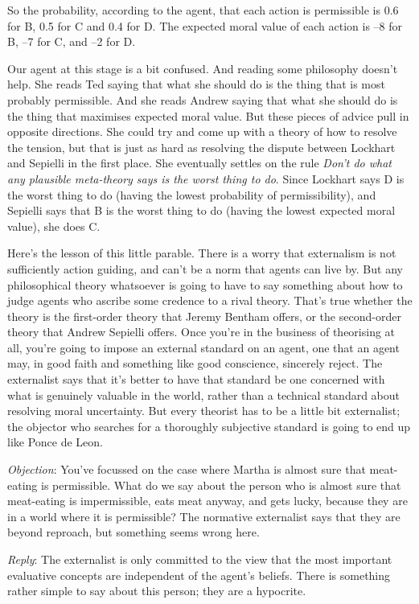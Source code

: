 So the probability, according to the agent, that each action is permissible is 0.6 for B, 0.5 for C and 0.4 for D. The expected moral value of each action is --8 for B, --7 for C, and --2 for D.

Our agent at this stage is a bit confused. And reading some philosophy doesn't help. She reads Ted  \citet{Lockhart2000} saying that what she should do is the thing that is most probably permissible. And she reads Andrew  \citet{Sepielli2009} saying that what she should do is the thing that maximises expected moral value. But these pieces of advice pull in opposite directions. She could try and come up with a theory of how to resolve the tension, but that is just as hard as resolving the dispute between Lockhart and Sepielli in the first place. She eventually settles on the rule \emph{Don't do what any plausible meta-theory says is the worst thing to do}. Since Lockhart says D is the worst thing to do (having the lowest probability of permissibility), and Sepielli says that B is the worst thing to do (having the lowest expected moral value), she does C. 

Here's the lesson of this little parable. There is a worry that externalism is not sufficiently action guiding, and can't be a norm that agents can live by. But any philosophical theory whatsoever is going to have to say something about how to judge agents who ascribe some credence to a rival theory. That's true whether the theory is the first-order theory that Jeremy Bentham offers, or the second-order theory that Andrew Sepielli offers. Once you're in the business of theorising at all, you're going to impose an external standard on an agent, one that an agent may, in good faith and something like good conscience, sincerely reject. The externalist says that it's better to have that standard be one concerned with what is genuinely valuable in the world, rather than a technical standard about resolving moral uncertainty. But every theorist has to be a little bit externalist; the objector who searches for a thoroughly subjective standard is going to end up like Ponce de Leon.

\emph{Objection}: You've focussed on the case where Martha is almost sure that meat-eating is permissible. What do we say about the person who is almost sure that meat-eating is impermissible, eats meat anyway, and gets lucky, because they are in a world where it is permissible? The normative externalist says that they are beyond reproach, but something seems wrong here.

\emph{Reply}: The externalist is only committed to the view that the most important evaluative concepts are independent of the agent's beliefs. There is something rather simple to say about this person; they are a hypocrite.

